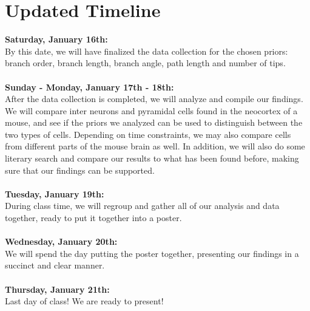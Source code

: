 \documentclass[11pt]{article} %
\begin{document}
\section{Updated Timeline}
\textbf{Saturday, January 16th:} \\
By this date, we will have finalized the data collection for the  chosen priors: branch order, branch length, branch angle, path length and number of tips. \\
\\
\textbf{Sunday - Monday, January 17th - 18th:} \\
After the data collection is completed, we will analyze and compile our findings. We will compare inter neurons and pyramidal cells found in the neocortex of a mouse, and see if the priors we analyzed can be used to distinguish between the two types of cells. Depending on time constraints, we may also compare cells from different parts of the  mouse brain as well. In addition, we will also do some literary search and compare our results to what has been found before, making sure that our findings can be supported. \\
\\
\textbf{Tuesday, January 19th:} \\
During class time, we will regroup and gather all of our analysis and data together, ready to put it together into a poster.\\
\\
\textbf{Wednesday, January 20th:} \\
We will spend the day putting the poster together, presenting our findings in a succinct and clear manner.\\
\\
\textbf{Thursday, January 21th:} \\
Last day of class! We are ready to present!

{}

\end{document}
